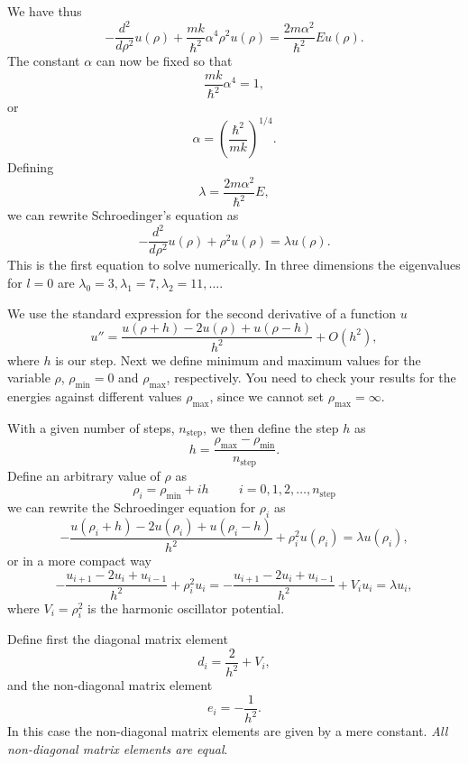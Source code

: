 \documentclass[%
oneside,                 %
final,                   %
10pt]{article}
\begin{document}
We have thus
\[
  -\frac{d^2}{d\rho^2} u(\rho) 
       + \frac{mk}{\hbar^2} \alpha^4\rho^2u(\rho)  = \frac{2m\alpha^2}{\hbar^2}E u(\rho) .
\]
The constant $\alpha$ can now be fixed
so that
\[
\frac{mk}{\hbar^2} \alpha^4 = 1,
\]
or 
\[
\alpha = \left(\frac{\hbar^2}{mk}\right)^{1/4}.
\]
Defining
\[
\lambda = \frac{2m\alpha^2}{\hbar^2}E,
\]
we can rewrite Schroedinger's equation as
\[
  -\frac{d^2}{d\rho^2} u(\rho) + \rho^2u(\rho)  = \lambda u(\rho) .
\]
This is the first equation to solve numerically. In three dimensions 
the eigenvalues for $l=0$ are 
$\lambda_0=3,\lambda_1=7,\lambda_2=11,\dots .$


We use the standard
expression for the second derivative of a function $u$
\begin{equation}
    u''=\frac{u(\rho+h) -2u(\rho) +u(\rho-h)}{h^2} +O(h^2),
    \label{eq:diffoperation}
\end{equation} 
where $h$ is our step.
Next we define minimum and maximum values for the variable $\rho$,
$\rho_{\mathrm{min}}=0$  and $\rho_{\mathrm{max}}$, respectively.
You need to check your results for the energies against different values
$\rho_{\mathrm{max}}$, since we cannot set
$\rho_{\mathrm{max}}=\infty$. 


With a given number of steps, $n_{\mathrm{step}}$, we then 
define the step $h$ as
\[
  h=\frac{\rho_{\mathrm{max}}-\rho_{\mathrm{min}} }{n_{\mathrm{step}}}.
\]
Define an arbitrary value of $\rho$ as 
\[
    \rho_i= \rho_{\mathrm{min}} + ih \hspace{1cm} i=0,1,2,\dots , n_{\mathrm{step}}
\]
we can rewrite the Schroedinger equation for $\rho_i$ as
\[
-\frac{u(\rho_i+h) -2u(\rho_i) +u(\rho_i-h)}{h^2}+\rho_i^2u(\rho_i)  = \lambda u(\rho_i),
\]
or in  a more compact way
\[
-\frac{u_{i+1} -2u_i +u_{i-1}}{h^2}+\rho_i^2u_i=-\frac{u_{i+1} -2u_i +u_{i-1} }{h^2}+V_iu_i  = \lambda u_i,
\]
where $V_i=\rho_i^2$ is the harmonic oscillator potential.


Define first the diagonal matrix element
\[
   d_i=\frac{2}{h^2}+V_i,
\]
and the non-diagonal matrix element 
\[
   e_i=-\frac{1}{h^2}.
\]
In this case the non-diagonal matrix elements are given by a mere constant. \emph{All non-diagonal matrix elements are equal}.
\end{document}
